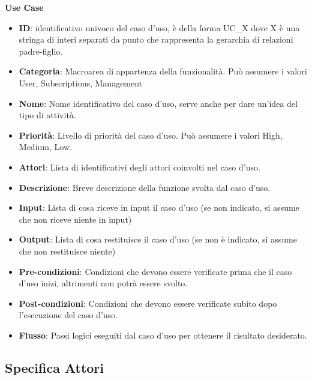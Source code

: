 \noindent \large{\textbf{Use Case}} \\
\begin{itemize}[]
	\item \textbf{ID}: identificativo univoco del caso d'uso, è della forma UC\_X dove X è una stringa di interi separati da punto che rappresenta la gerarchia di relazioni padre-figlio.
	\item \textbf{Categoria}: Macroarea di appartenza della funzionalità. Può assumere i valori {User, Subscriptions, Management}
	\item \textbf{Nome}: Nome identificativo del caso d'uso, serve anche per dare un'idea del tipo di attività.
	\item \textbf{Priorità}: Livello di priorità del caso d'uso. Può assumere i valori {High, Medium, Low}. 
	\item \textbf{Attori}: Lista di identificativi degli attori coinvolti nel caso d'uso.
	\item \textbf{Descrizione}: Breve descrizione della funzione svolta dal caso d'uso.
	\item \textbf{Input}: Lista di cosa riceve in input il caso d'uso (se non indicato, si assume che non riceve niente in input)
	\item \textbf{Output}: Lista di cosa restituisce il caso d'uso (se non è indicato, si assume che non restituisce niente)
	\item \textbf{Pre-condizioni}: Condizioni che devono essere verificate prima che il caso d'uso inizi, altrimenti non potrà essere svolto.
	\item \textbf{Post-condizioni}: Condizioni che devono essere verificate subito dopo l'esecuzione del caso d'uso.
	\item \textbf{Flusso}: Passi logici eseguiti dal caso d'uso per ottenere il risultato desiderato.

\end{itemize}


\subsection{Specifica Attori}

